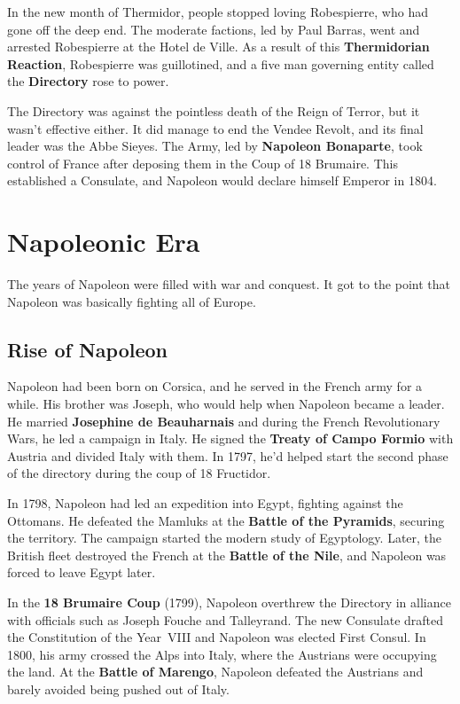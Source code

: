 In the new month of Thermidor, people stopped loving Robespierre, who had gone off the deep end.
The moderate factions, led by Paul Barras, went and arrested Robespierre at the Hotel de Ville.
As a result of this \textbf{Thermidorian Reaction}, Robespierre was guillotined,
and a five man governing entity called the \textbf{Directory} rose to power.

The Directory was against the pointless death of the Reign of Terror,
but it wasn't effective either.
It did manage to end the Vendee Revolt, and its final leader was the Abbe Sieyes.
The Army, led by \textbf{Napoleon Bonaparte},
took control of France after deposing them in the Coup of 18 Brumaire.
This established a Consulate, and Napoleon would declare himself Emperor in 1804.

\section{Napoleonic Era}

The years of Napoleon were filled with war and conquest.
It got to the point that Napoleon was basically fighting all of Europe.

\subsection*{Rise of Napoleon}

Napoleon had been born on Corsica, and he served in the French army for a while.
His brother was Joseph, who would help when Napoleon became a leader.
He married \textbf{Josephine de Beauharnais} and during the French Revolutionary Wars,
he led a campaign in Italy.
He signed the \textbf{Treaty of Campo Formio} with Austria and divided Italy with them.
In 1797, he'd helped start the second phase of the directory during the coup of 18 Fructidor.

In 1798, Napoleon had led an expedition into Egypt, fighting against the Ottomans.
He defeated the Mamluks at the \textbf{Battle of the Pyramids}, securing the territory.
The campaign started the modern study of Egyptology.
Later, the British fleet destroyed the French at the \textbf{Battle of the Nile},
and Napoleon was forced to leave Egypt later.

In the \textbf{18 Brumaire Coup} (1799),
Napoleon overthrew the Directory in alliance with officials such as Joseph Fouche and Talleyrand.
The new Consulate drafted the Constitution of the Year~VIII and Napoleon was elected First Consul.
In 1800, his army crossed the Alps into Italy, where the Austrians were occupying the land.
At the \textbf{Battle of Marengo},
Napoleon defeated the Austrians and barely avoided being pushed out of Italy.

